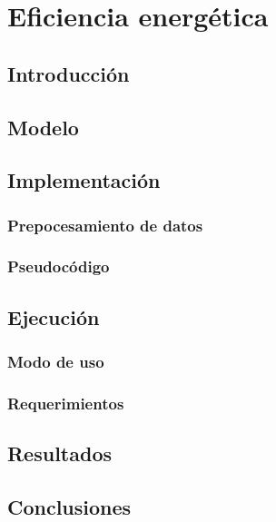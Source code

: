 \newpage
\section{Eficiencia energética}

\subsection{Introducción}

\subsection{Modelo}

\subsection{Implementación}

\subsubsection{Prepocesamiento de datos}

\subsubsection{Pseudocódigo}

\subsection{Ejecución}

\subsubsection{Modo de uso}

\subsubsection{Requerimientos}

\subsection{Resultados}

\subsection{Conclusiones}
